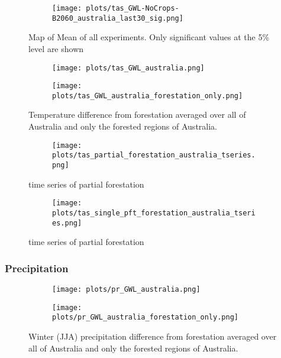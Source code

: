 \documentclass[]{article}
\begin{document}
\begin{figure}[H]
    \centering
    \begin{subfigure}[b]{\linewidth}
        \texttt{[image: plots/tas\_GWL-NoCrops-B2060\_australia\_last30\_sig.png]}
    \end{subfigure}
    \caption{Map of Mean of all experiments. Only significant values at the 5\% level are shown}
    \label{fig:tas_australia_map}
\end{figure}

\begin{figure}[H]
    \centering
    \begin{subfigure}[b]{0.4\linewidth}
        \texttt{[image: plots/tas\_GWL\_australia.png]}
    \end{subfigure}
    \begin{subfigure}[b]{0.4\linewidth}
        \texttt{[image: plots/tas\_GWL\_australia\_forestation\_only.png]}
    \end{subfigure}
    \caption{Temperature difference from forestation averaged over all of Australia and only the forested regions of Australia.}
    \label{fig:tas_australia_timeseries}
\end{figure}

\begin{figure}[H]
    \centering
    \begin{subfigure}[b]{\linewidth}
        \texttt{[image: plots/tas\_partial\_forestation\_australia\_tseries.png]}
    \end{subfigure}
    \caption{time series of partial forestation}
    \label{fig:tas_australia_partial}
\end{figure}

\begin{figure}[H]
    \centering
    \begin{subfigure}[b]{\linewidth}
        \texttt{[image: plots/tas\_single\_pft\_forestation\_australia\_tseries.png]}
    \end{subfigure}
    \caption{time series of partial forestation}
    \label{fig:tas_australia_single}
\end{figure}

\subsubsection{Precipitation}

\begin{figure}[H]
    \centering
    \begin{subfigure}[b]{0.4\linewidth}
        \texttt{[image: plots/pr\_GWL\_australia.png]}
    \end{subfigure}
    \begin{subfigure}[b]{0.4\linewidth}
        \texttt{[image: plots/pr\_GWL\_australia\_forestation\_only.png]}
    \end{subfigure}
    \caption{Winter (JJA) precipitation difference from forestation averaged over all of Australia and only the forested regions of Australia.}
    \label{fig:pr_australia_timeseries}
\end{figure}
\end{document}
